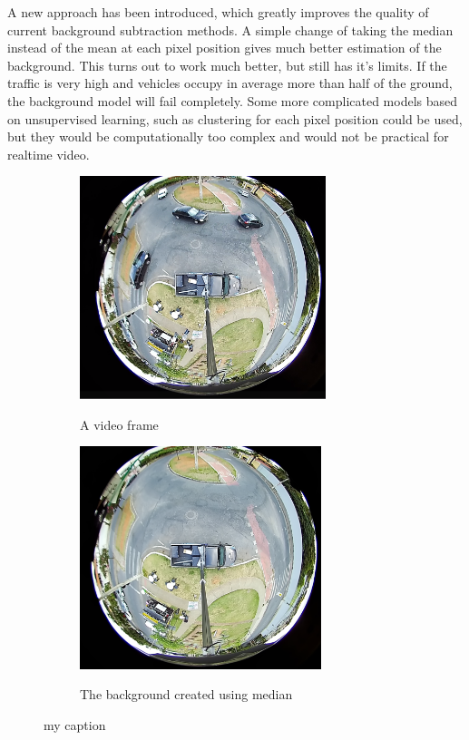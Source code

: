 \documentclass[a4paper,12pt,titlepage, twoside]{article}
\numberwithin{figure}{section}
\begin{document}
A new approach has been introduced, which greatly improves the quality of current background subtraction methods. A simple change of taking the median instead of the mean at each pixel position gives much better estimation of the background. This turns out to work much better, but still has it's limits. If the traffic is very high and vehicles occupy in average more than half of the ground, the background model will fail completely. Some more complicated models based on unsupervised learning, such as clustering for each pixel position could be used, but they would be computationally too complex and would not be practical for realtime video.



\begin{figure}
    \begin{subfigure}[Sample1]{0.5\linewidth}
        \includegraphics[height=65mm]{fig/frame.png}
        \label{fig:a}
        \caption{A video frame}
    \end{subfigure}
    \qquad
    \begin{subfigure}[Sample1]{0.5\linewidth}    
        \includegraphics[height=65mm]{fig/background.png}
        \label{fig:b}    
        \caption{The background created using median}
    \end{subfigure} 
    \caption{my caption}
\end{figure}
\end{document}

